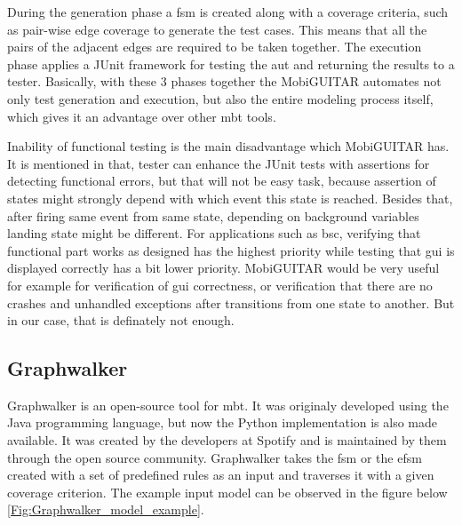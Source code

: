 During the generation phase a \acrshort{fsm} is created along with a coverage criteria, such as pair-wise edge coverage to generate the test cases. This means that all the pairs of the adjacent edges are required to be taken together.
The execution phase applies a JUnit framework for testing the \acrshort{aut} and returning the results to a tester. Basically, with these 3 phases together the MobiGUITAR automates not only test generation and execution, but also the entire modeling process itself, which gives it an advantage over other \acrshort{mbt} tools.

\par
Inability of functional testing is the main disadvantage which MobiGUITAR has. It is mentioned in \cite{MobiGUITAR} that, tester can enhance the JUnit tests with assertions for detecting functional errors, but that will not be easy task, because assertion of states might strongly depend with which event this state is reached. Besides that, after firing same event from same state, depending on background variables landing state might be different. For applications such as \acrshort{bsc}, verifying that functional part works as designed has the highest priority while testing that \acrshort{gui} is displayed correctly has a bit lower priority. MobiGUITAR would be very useful for example for verification of \acrshort{gui} correctness, or verification that there are no crashes and unhandled exceptions after transitions from one state to another. But in our case, that is definately not enough.

\subsection{Graphwalker}
\par
Graphwalker \cite{Graphwalker_Description} is an open-source tool for \acrshort{mbt}. It was originaly developed using the Java programming language, but now the Python implementation is also made available. It was created by the developers at Spotify \cite{Spotify} and is maintained by them through the open source community. Graphwalker takes the \acrshort{fsm} or the \acrshort{efsm} created with a set of predefined rules as an input and traverses it with a given coverage criterion.
The example input model can be observed in the figure below \ref{Fig:Graphwalker_model_example}.

